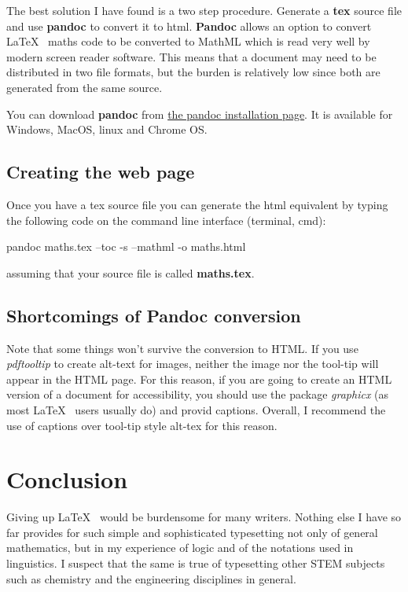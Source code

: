 \documentclass[]{article}
\begin{document}
The best solution I have found is a two step procedure. Generate a
\textbf{tex} source file and use \textbf{pandoc} to convert it to html.
\textbf{Pandoc} allows an option to convert \LaTeX~ maths code to be
converted to MathML which is read very well by modern screen reader
software. This means that a document may need to be distributed in two
file formats, but the burden is relatively low since both are generated
from the same source.

You can download \textbf{pandoc} from
\href{https://pandoc.org/installing.html}{the pandoc installation page}.
It is available for Windows, MacOS, linux and Chrome OS.

\hypertarget{creating-the-web-page}{%
\subsection{Creating the web page}\label{creating-the-web-page}}

Once you have a tex source file you can generate the html equivalent by
typing the following code on the command line interface (terminal, cmd):

pandoc maths.tex --toc -s --mathml -o maths.html

assuming that your source file is called \textbf{maths.tex}.

\subsection{Shortcomings of Pandoc conversion}

Note that some things won't survive the conversion to HTML.  If you use
\emph{pdftooltip} to create alt-text for images, neither the image nor the tool-tip will appear in the 
HTML page.  For this reason, if you are going to create an HTML version of a document for accessibility, you 
should use the package \emph{graphicx} (as most \LaTeX~ users usually do) and provid captions.  Overall, 
I recommend the use of captions over tool-tip style alt-tex for this reason.

\hypertarget{conclusion}{%
\section{Conclusion}\label{conclusion}}

Giving up \LaTeX~ would be burdensome for many writers. Nothing else I
have so far provides for such simple and sophisticated typesetting not
only of general mathematics, but in my experience of logic and of the
notations used in linguistics. I suspect that the same is true of
typesetting other STEM subjects such as chemistry and the engineering
disciplines in general.
\end{document}
